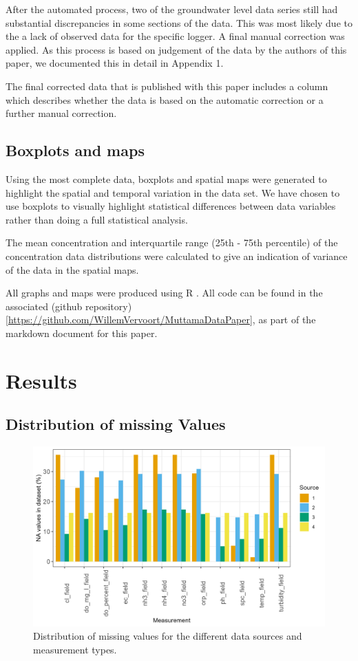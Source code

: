 \documentclass[, manuscript]{copernicus}
\begin{document}
After the automated process, two of the groundwater level data series
still had substantial discrepancies in some sections of the data. This
was most likely due to the a lack of observed data for the specific
logger. A final manual correction was applied. As this process is based
on judgement of the data by the authors of this paper, we documented
this in detail in Appendix 1.

The final corrected data that is published with this paper includes a
column which describes whether the data is based on the automatic
correction or a further manual correction.

\subsection{Boxplots and maps}

Using the most complete data, boxplots and spatial maps were generated
to highlight the spatial and temporal variation in the data set. We have
chosen to use boxplots to visually highlight statistical differences
between data variables rather than doing a full statistical analysis.

The mean concentration and interquartile range (25th - 75th percentile)
of the concentration data distributions were calculated to give an
indication of variance of the data in the spatial maps.

All graphs and maps were produced using R \citep{R2023}. All code can be
found in the associated (github
repository){[}\url{https://github.com/WillemVervoort/MuttamaDataPaper}{]},
as part of the markdown document for this paper.

\section{Results}

\subsection{Distribution of missing Values}

\clearpage

\begin{figure}
\includegraphics[width=0.9\linewidth]{Figures/na_count} \caption{Distribution of missing values for the different data sources and measurement types.}\label{fig:na-plot}
\end{figure}
\end{document}
